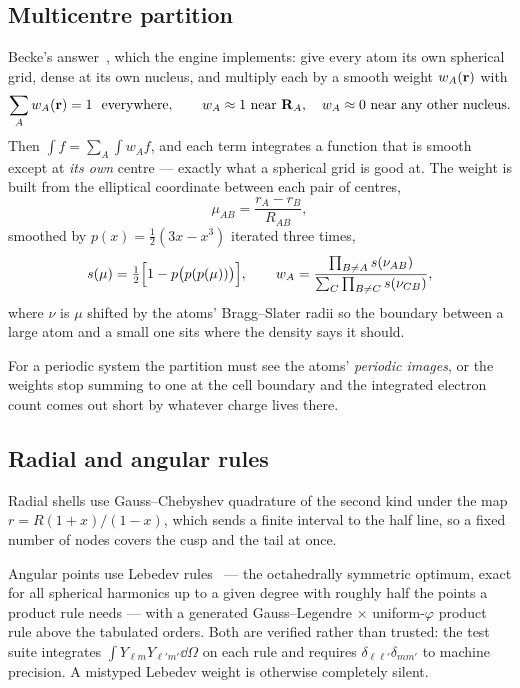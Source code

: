 \documentclass[11pt,a4paper]{article}
\begin{document}
\subsection{Multicentre partition}

Becke's answer~\cite{becke}, which the engine implements: give every atom its
own spherical grid, dense at its own nucleus, and multiply each by a smooth
weight $w_A(\vb{r})$ with
\begin{equation}
  \sum_A w_A(\vb{r}) = 1 \ \ \text{everywhere}, \qquad
  w_A \approx 1 \ \text{near } \vb{R}_A , \quad
  w_A \approx 0 \ \text{near any other nucleus}.
\end{equation}
Then $\int f = \sum_A \int w_A f$, and each term integrates a function that is
smooth except at \emph{its own} centre --- exactly what a spherical grid is
good at. The weight is built from the elliptical coordinate between each pair
of centres,
\begin{equation}
  \mu_{AB} = \frac{r_A - r_B}{R_{AB}},
\end{equation}
smoothed by $p(x) = \tfrac12(3x - x^3)$ iterated three times,
\begin{equation}
  s(\mu) = \tfrac12\Bigl[1 - p\bigl(p(p(\mu))\bigr)\Bigr],
  \qquad
  w_A = \frac{\prod_{B \neq A} s(\nu_{AB})}
             {\sum_C \prod_{B \neq C} s(\nu_{CB})} ,
\end{equation}
where $\nu$ is $\mu$ shifted by the atoms' Bragg--Slater radii so the boundary
between a large atom and a small one sits where the density says it should.

For a periodic system the partition must see the atoms' \emph{periodic
images}, or the weights stop summing to one at the cell boundary and the
integrated electron count comes out short by whatever charge lives there.

\subsection{Radial and angular rules}

Radial shells use Gauss--Chebyshev quadrature of the second kind under the
map $r = R(1+x)/(1-x)$, which sends a finite interval to the half line, so a
fixed number of nodes covers the cusp and the tail at once.

Angular points use Lebedev rules~\cite{lebedev} --- the octahedrally symmetric
optimum, exact for all spherical harmonics up to a given degree with roughly
half the points a product rule needs --- with a generated
Gauss--Legendre $\times$ uniform-$\varphi$ product rule above the tabulated
orders. Both are verified rather than trusted: the test suite integrates
$\int Y_{\ell m} Y_{\ell' m'} \dd\Omega$ on each rule and requires
$\delta_{\ell\ell'}\delta_{mm'}$ to machine precision. A mistyped Lebedev
weight is otherwise completely silent.
\end{document}
